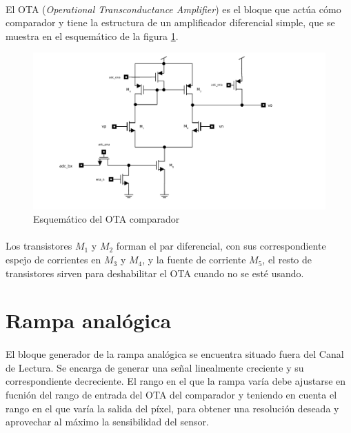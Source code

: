 \paragraph{}
El OTA (\textit{Operational Transconductance Amplifier}) es el bloque que actúa
cómo comparador y tiene la estructura de un amplificador diferencial simple, que
se muestra en el esquemático de la figura \ref{fig:ota_sch}.

\begin{figure}[h]
	\includegraphics[width=\textwidth]{svg/ota_sch.pdf}
	\caption{Esquemático del OTA comparador}
	\label{fig:ota_sch}
\end{figure}

\paragraph{}
Los transistores $M_1$ y $M_2$ forman el par diferencial, con sus correspondiente
espejo de corrientes en $M_3$ y $M_4$, y la fuente de corriente $M_5$, el resto de
transistores sirven para deshabilitar el OTA cuando no se esté usando.

\section{Rampa analógica}\label{cap:ro_sch_armp}

\paragraph{}
El bloque generador de la rampa analógica se encuentra situado fuera del Canal de
Lectura. Se encarga de generar una señal linealmente creciente y su correspondiente
decreciente. El rango en el que la rampa varía debe ajustarse en fucnión del rango
de entrada del OTA del comparador y teniendo en cuenta el rango en el que varía
la salida del píxel, para obtener una resolución deseada y aprovechar al máximo
la sensibilidad del sensor.

